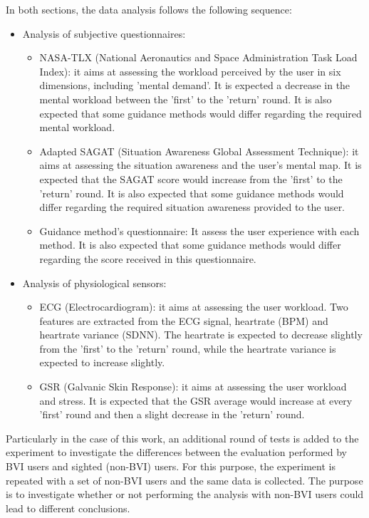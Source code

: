 In both sections, the data analysis follows the following sequence:

\begin{itemize}
    \item Analysis of subjective questionnaires:
    \begin{itemize}
        \item NASA-TLX (National Aeronautics and Space Administration Task Load Index): it aims at assessing the workload perceived by the user in six dimensions, including 'mental demand'. It is expected a decrease in the mental workload between the 'first' to the 'return' round. It is also expected that some guidance methods would differ regarding the required mental workload.
        \item Adapted SAGAT (Situation Awareness Global Assessment Technique): it aims at assessing the situation awareness and the user's mental map. It is expected that the SAGAT score would increase from the 'first' to the 'return' round. It is also expected that some guidance methods would differ regarding the required situation awareness provided to the user.
        \item Guidance method's questionnaire: It assess the user experience with each method. It is also expected that some guidance methods would differ regarding the score received in this questionnaire.
    \end{itemize}
    \item Analysis of physiological sensors:
    \begin{itemize}
        \item ECG (Electrocardiogram): it aims at assessing the user workload. Two features are extracted from the ECG signal, heartrate (BPM) and heartrate variance (SDNN). The heartrate is expected to decrease slightly from the 'first' to the 'return' round, while the heartrate variance is expected to increase slightly.
        \item GSR (Galvanic Skin Response): it aims at assessing the user workload and stress. It is expected that the GSR average would increase at every 'first' round and then a slight decrease in the 'return' round.
    \end{itemize}
\end{itemize}

Particularly in the case of this work, an additional round of tests is added to the experiment to investigate the differences between the evaluation performed by BVI users and sighted (non-BVI) users. For this purpose, the experiment is repeated with a set of non-BVI users and the same data is collected. The purpose is to investigate whether or not performing the analysis with non-BVI users could lead to different conclusions.


